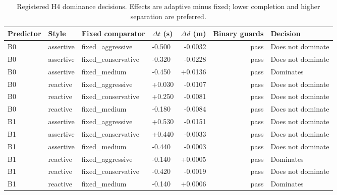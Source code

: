 \begin{table}[h]
\centering\small
\caption{Registered H4 dominance decisions. Effects are adaptive minus fixed; lower completion and higher separation are preferred.}
\label{tab:app-h4-dominance}
\begin{tabular}{@{}llllrrl@{}}
\toprule
Predictor & Style & Fixed comparator & $\Delta t$ (s) & $\Delta d$ (m) & Binary guards & Decision \\
\midrule
B0 & assertive & fixed\_aggressive & -0.500 & -0.0032 & pass & Does not dominate \\
B0 & assertive & fixed\_conservative & -0.320 & -0.0228 & pass & Does not dominate \\
B0 & assertive & fixed\_medium & -0.450 & +0.0136 & pass & Dominates \\
B0 & reactive & fixed\_aggressive & +0.030 & -0.0107 & pass & Does not dominate \\
B0 & reactive & fixed\_conservative & +0.250 & -0.0081 & pass & Does not dominate \\
B0 & reactive & fixed\_medium & -0.180 & -0.0084 & pass & Does not dominate \\
B1 & assertive & fixed\_aggressive & +0.530 & -0.0151 & pass & Does not dominate \\
B1 & assertive & fixed\_conservative & +0.440 & -0.0033 & pass & Does not dominate \\
B1 & assertive & fixed\_medium & -0.440 & -0.0003 & pass & Does not dominate \\
B1 & reactive & fixed\_aggressive & -0.140 & +0.0005 & pass & Dominates \\
B1 & reactive & fixed\_conservative & -0.420 & -0.0019 & pass & Does not dominate \\
B1 & reactive & fixed\_medium & -0.140 & +0.0006 & pass & Dominates \\
\bottomrule
\end{tabular}
\end{table}
